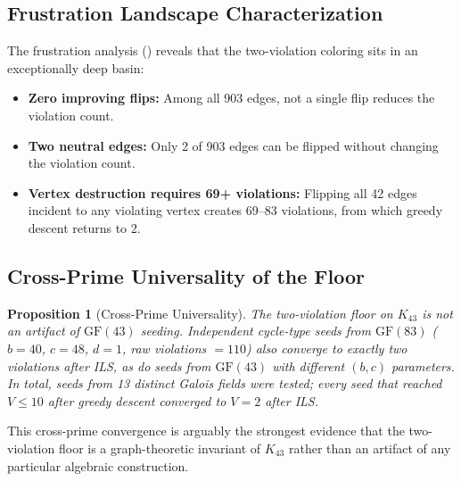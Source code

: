 \documentclass[11pt,a4paper]{article}
\theoremstyle{plain}
\newtheorem{proposition}[theorem]{Proposition}
\theoremstyle{remark}
\newcommand{\GF}{\mathrm{GF}}
\begin{document}
\subsection{Frustration Landscape Characterization}

The frustration analysis () reveals that the
two-violation coloring sits in an exceptionally deep basin:

\begin{itemize}[leftmargin=2em]
  \item \textbf{Zero improving flips:} Among all 903 edges, not a
    single flip reduces the violation count.
  \item \textbf{Two neutral edges:} Only 2 of 903 edges can be
    flipped without changing the violation count.
  \item \textbf{Vertex destruction requires 69+ violations:} Flipping
    all 42 edges incident to any violating vertex creates 69--83
    violations, from which greedy descent returns to 2.
\end{itemize}

\subsection{Cross-Prime Universality of the Floor}

\begin{proposition}[Cross-Prime Universality]\label{prop:cross-prime}
The two-violation floor on $K_{43}$ is not an artifact of $\GF(43)$
seeding. Independent cycle-type seeds from $\GF(83)$ ($b=40$, $c=48$,
$d=1$, raw violations $= 110$) also converge to exactly two
violations after ILS, as do seeds from $\GF(43)$ with different
$(b,c)$ parameters. In total, seeds from 13 distinct Galois fields
were tested; every seed that reached $V \leq 10$ after greedy
descent converged to $V = 2$ after ILS.
\end{proposition}

This cross-prime convergence is arguably the strongest evidence that
the two-violation floor is a graph-theoretic invariant of $K_{43}$
rather than an artifact of any particular algebraic construction.
\end{document}
